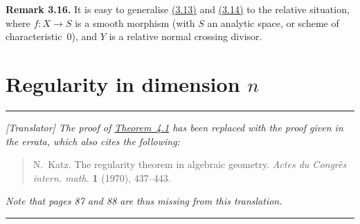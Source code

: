 \documentclass{report}
\newenvironment{rmenv}[1]
  {\phantomsection\par\medskip\noindent\textbf{#1.}\rmfamily}
  {\medskip}
\begin{document}
\begin{rmenv}{Remark 3.16}
\label{II.3.16}
  It is easy to generalise \hyperref[II.3.13]{(3.13)} and \hyperref[II.3.14]{(3.14)} to the relative situation, where $f\colon X\to S$ is a smooth morphism (with $S$ an analytic space, or scheme of characteristic~$0$), and $Y$ is a relative normal crossing divisor.
\end{rmenv}


\section{Regularity in dimension \texorpdfstring{$n$}{n}}
\label{II.4}

\medskip
\hrule
\medskip

\emph{[Translator] The proof of \hyperref[II.4.1]{Theorem~4.1} has been replaced with the proof given in the errata, which also cites the following:}
\begin{quote}
  N.~Katz.
  The regularity theorem in algebraic geometry.
  \emph{Actes du Congr\`{e}s intern. math.} \textbf{1} (1970), 437--443.
\end{quote}
\emph{Note that pages 87 and 88 are thus missing from this translation.}

\medskip
\hrule
\medskip
\end{document}
